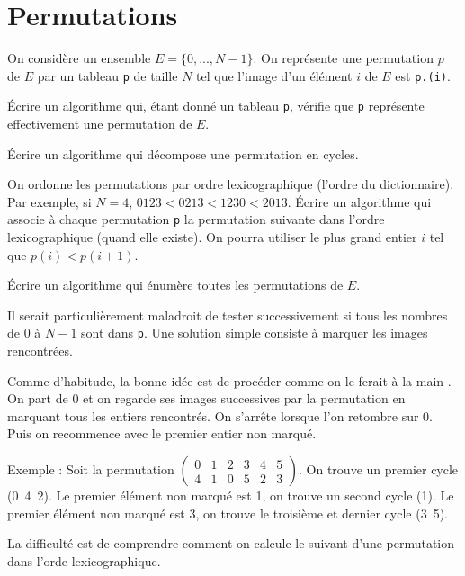 \renewcommand{\SourceFile}{1-parcours-de-tableaux/src/1-7.ml}

\section{Permutations}

On considère un ensemble $E=\{0,...,N-1\}$. On représente une permutation $p$ de $E$ par un tableau \texttt{p} de taille $N$ tel que l'image d'un élément $i$ de $E$ est \texttt{p.(i)}.

\Q
Écrire un algorithme qui, étant donné un tableau \texttt{p}, vérifie que \texttt{p} représente effectivement une permutation de $E$.

\Q
Écrire un algorithme qui décompose une permutation en cycles.

\Q
On ordonne les permutations par ordre lexicographique (l'ordre du dictionnaire). Par exemple, si $N=4$, $0123<0213<1230<2013$. Écrire un algorithme qui associe à chaque permutation \texttt{p} la permutation suivante dans l'ordre lexicographique (quand elle existe). On pourra utiliser le plus grand entier $i$ tel que $p(i)<p(i+1)$.

\Q
Écrire un algorithme qui énumère toutes les permutations de $E$.

\Corrige

\Q
Il serait particulièrement maladroit de tester successivement si tous les nombres de 0 à $N-1$ sont dans \texttt{p}. Une solution simple consiste à marquer les images rencontrées.



\Q
Comme d'habitude, la bonne idée est de procéder comme on le ferait \og à la main \fg{}. On part de 0 et on regarde ses images successives par la permutation en marquant tous les entiers rencontrés. On s'arrête lorsque l'on retombre sur 0. Puis on recommence avec le premier entier non marqué.
\medskip

Exemple : Soit la permutation $\begin{pmatrix}
    0 & 1 & 2 & 3 & 4 & 5 \\
    4 & 1 & 0 & 5 & 2 & 3
\end{pmatrix}$.
On trouve un premier cycle (0~4~2). Le premier élément non marqué est 1, on trouve un second cycle (1). Le premier élément non marqué est 3, on trouve le troisième et dernier cycle (3~5).



\Q
La difficulté est de comprendre comment on calcule le suivant d'une permutation dans l'orde lexicographique.
\medskip

